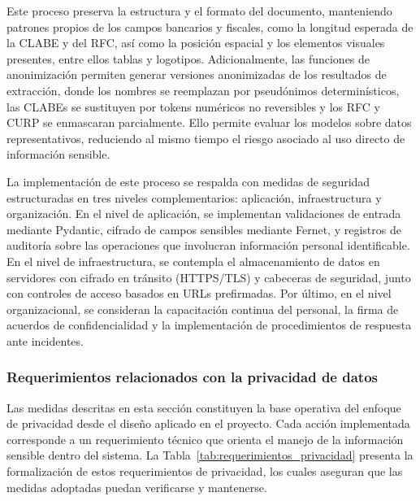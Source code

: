 \noindent Este proceso preserva la estructura y el formato del documento, manteniendo patrones propios de los campos bancarios y fiscales, como la longitud esperada de la CLABE y del RFC, así como la posición espacial y los elementos visuales presentes, entre ellos tablas y logotipos. Adicionalmente, las funciones de anonimización permiten generar versiones anonimizadas de los resultados de extracción, donde los nombres se reemplazan por pseudónimos determinísticos, las CLABEs se sustituyen por tokens numéricos no reversibles y los RFC y CURP se enmascaran parcialmente. Ello permite evaluar los modelos sobre datos representativos, reduciendo al mismo tiempo el riesgo asociado al uso directo de información sensible.

La implementación de este proceso se respalda con medidas de seguridad estructuradas en tres niveles complementarios: aplicación, infraestructura y organización. En el nivel de aplicación, se implementan validaciones de entrada mediante Pydantic, cifrado de campos sensibles mediante Fernet, y registros de auditoría sobre las operaciones que involucran información personal identificable. En el nivel de infraestructura, se contempla el almacenamiento de datos en servidores con cifrado en tránsito (HTTPS/TLS) y cabeceras de seguridad, junto con controles de acceso basados en URLs prefirmadas. Por último, en el nivel organizacional, se consideran la capacitación continua del personal, la firma de acuerdos de confidencialidad y la implementación de procedimientos de respuesta ante incidentes.

\subsubsection{Requerimientos relacionados con la privacidad de datos}

Las medidas descritas en esta sección constituyen la base operativa del enfoque de privacidad desde el diseño aplicado en el proyecto. Cada acción implementada corresponde a un requerimiento técnico que orienta el manejo de la información sensible dentro del sistema. La Tabla~\ref{tab:requerimientos_privacidad} presenta la formalización de estos requerimientos de privacidad, los cuales aseguran que las medidas adoptadas puedan verificarse y mantenerse.

